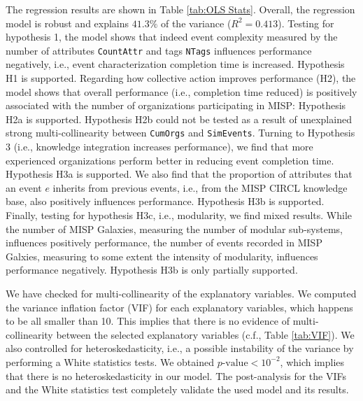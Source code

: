 \documentclass[unnumsec,webpdf,contemporary,large]{oup-authoring-template}%
\theoremstyle{thmstyleone}%
\theoremstyle{thmstyletwo}%
\theoremstyle{thmstylethree}%
\begin{document}
The regression results are shown in Table \ref{tab:OLS Stats}. Overall, the regression model is robust and explains $41.3\%$ of the variance ($R^2 = 0.413$). Testing for hypothesis 1, the model shows that indeed event complexity measured by the number of attributes \texttt{CountAttr} and tags \texttt{NTags} influences performance negatively, i.e., event characterization completion time is increased. Hypothesis H1 is supported. Regarding how collective action improves performance (H2), the model shows that overall performance (i.e., completion time reduced) is positively associated with the number of organizations participating in MISP: Hypothesis H2a is supported. Hypothesis H2b could not be tested as a result of unexplained strong multi-collinearity between \texttt{CumOrgs} and \texttt{SimEvents}. Turning to Hypothesis 3 (i.e., knowledge integration increases performance), we find that more experienced organizations perform better in reducing event completion time. Hypothesis H3a is supported. We also find that the proportion of attributes that an event $e$ inherits from previous events, i.e., from the MISP CIRCL knowledge base, also positively influences performance. Hypothesis H3b is supported. Finally, testing for hypothesis H3c, i.e., modularity, we find mixed results. While the number of MISP Galaxies, measuring the number of modular sub-systems, influences positively performance, the number of events recorded in MISP Galxies, measuring to some extent the intensity of modularity, influences performance negatively. Hypothesis H3b is only partially supported.

 We have checked for multi-collinearity of the explanatory variables. We computed the variance inflation factor (VIF) for each explanatory variables, which happens to be all smaller than 10. This implies that there is no evidence of multi-collinearity between the selected explanatory variables (c.f., Table \ref{tab:VIF}). We also controlled for heteroskedasticity, i.e., a possible instability of the variance by performing a White statistics tests. We obtained $p\textrm{-value} < 10^{-2}$, which implies that there is no heteroskedasticity in our model. The post-analysis for the VIFs and the White statistics test completely validate the used model and its results.
\end{document}
